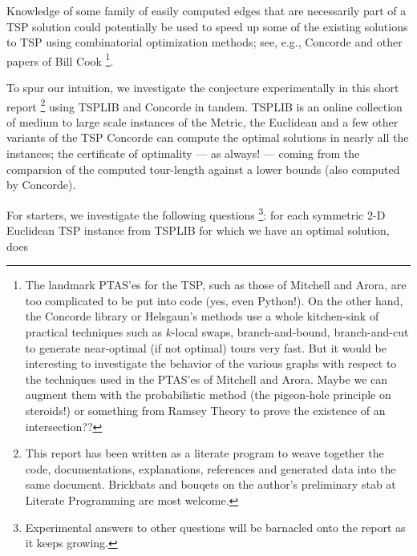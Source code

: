 \begin{description}
     Knowledge of some family of easily computed edges that are necessarily part of a TSP solution could potentially be used to speed up some 
     of the existing solutions to TSP using combinatorial optimization methods; see, e.g., Concorde \cite{applegate2009certification} and other papers of Bill Cook
     \footnote{The landmark PTAS'es for the TSP, such as those of Mitchell \cite{mitchell1999guillotine} and Arora\cite{arora1996polynomial},  are too complicated to be put into code (yes, even Python!). On the other hand, the Concorde library \cite{applegate2009certification} or Helsgaun's methods\cite{helsgaun2000effective}  use a whole kitchen-sink of practical techniques such as $k$-local swaps, branch-and-bound, branch-and-cut to generate  near-optimal (if not optimal) tours very fast. But it would be interesting to investigate the behavior of the various graphs with respect to the techniques used in the PTAS'es of Mitchell and Arora. Maybe we can augment them with the probabilistic method (the pigeon-hole principle on steroids!) or something from Ramsey Theory to prove the existence of an intersection??}.

     To spur our intuition,  we investigate the conjecture experimentally in this short report 
     \footnote{This report has been written as a literate program \cite{knuth1984literate,ramsey2008noweb} to weave together the code, documentations, explanations, references and generated data into the same document. Brickbats and bouqets on the author's preliminary stab at Literate Programming are most welcome.}
     using TSPLIB and Concorde in tandem. TSPLIB \cite{reinelt1991tsplib} is an online collection of medium to large scale instances of the Metric, the Euclidean and a few other variants of the TSP 
     Concorde can compute the optimal solutions in nearly all the instances; the certificate of optimality --- as always! --- coming from the comparsion of the computed tour-length against 
     a lower bounds (also computed by Concorde).

     For starters,  we investigate the following questions \footnote{Experimental answers to other questions will be barnacled onto the report as it keeps growing.}: 
     for each symmetric 2-D Euclidean TSP instance from TSPLIB for which we have an optimal solution, does


\end{description}
